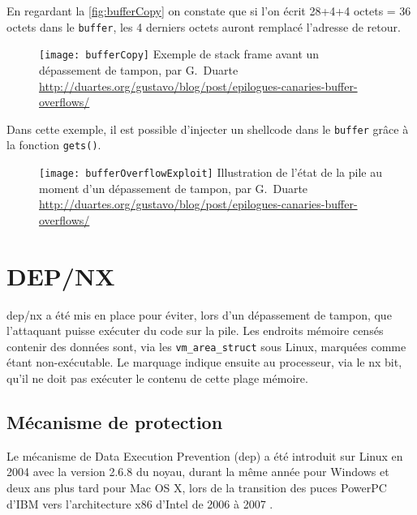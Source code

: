 En regardant la \autoref{fig:bufferCopy} on constate que si l'on écrit 28+4+4 octets = 36 octets dans le \texttt{buffer}, les 4 derniers octets auront remplacé l'adresse de retour.

\begin{figure}[H]
	\centering
	\texttt{[image: bufferCopy]}
	{Exemple de \og stack frame \fg avant un dépassement de tampon, par G.~Duarte}
	{\url{http://duartes.org/gustavo/blog/post/epilogues-canaries-buffer-overflows/}}
	\label{fig:bufferCopy}
\end{figure}

Dans cette exemple, il est possible d'injecter un \og shellcode \fg dans le \texttt{buffer} grâce à la fonction \texttt{gets()}.

\begin{figure}[H]
	\centering
	\texttt{[image: bufferOverflowExploit]}
	{Illustration de l'état de la pile au moment d'un dépassement de tampon, par G.~Duarte}
	{\url{http://duartes.org/gustavo/blog/post/epilogues-canaries-buffer-overflows/}}
	\label{fig:bufferOverflowExploit}
\end{figure}

\vfill

\section{DEP/NX}

\gls{dep}/\gls{nx} a été mis en place pour éviter, lors d'un dépassement de tampon, que l'attaquant puisse exécuter du code sur la pile. Les endroits mémoire censés contenir des données sont, via les \texttt{vm_area_struct} sous Linux, marquées comme étant non-exécutable. Le marquage indique ensuite au processeur, via le \gls{nx} bit, qu'il ne doit pas exécuter le contenu de cette plage mémoire.

\subsection{Mécanisme de protection}

Le mécanisme de Data Execution Prevention (\gls{dep}) a été introduit sur Linux en 2004 avec la version 2.6.8 du noyau, durant la même année pour Windows et deux ans plus tard pour Mac OS X, lors de la transition des puces PowerPC d'IBM vers l'architecture x86 d'Intel de 2006 à 2007 \cite{DataExecutionPrevention, PowerPC}.

